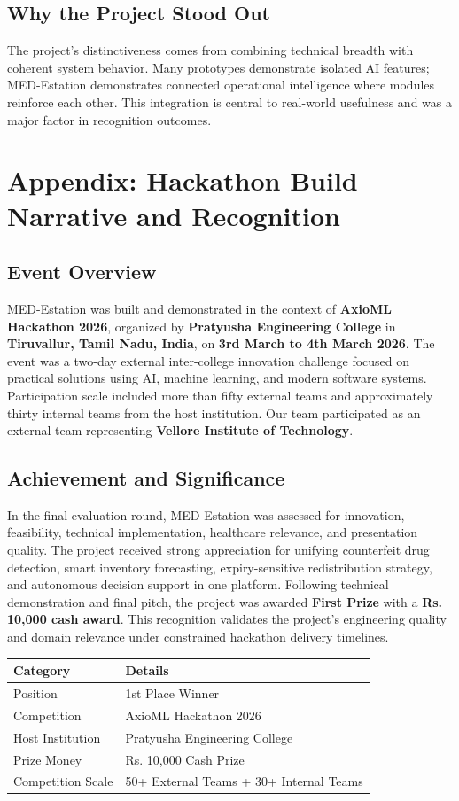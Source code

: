 \documentclass[12pt,a4paper]{article}
\begin{document}
\subsection{Why the Project Stood Out}
The project’s distinctiveness comes from combining technical breadth with coherent system behavior. Many prototypes demonstrate isolated AI features; MED-Estation demonstrates connected operational intelligence where modules reinforce each other. This integration is central to real-world usefulness and was a major factor in recognition outcomes.

\clearpage
\section{Appendix: Hackathon Build Narrative and Recognition}
\subsection{Event Overview}
MED-Estation was built and demonstrated in the context of \textbf{AxioML Hackathon 2026}, organized by \textbf{Pratyusha Engineering College} in \textbf{Tiruvallur, Tamil Nadu, India}, on \textbf{3rd March to 4th March 2026}. The event was a two-day external inter-college innovation challenge focused on practical solutions using AI, machine learning, and modern software systems. Participation scale included more than fifty external teams and approximately thirty internal teams from the host institution. Our team participated as an external team representing \textbf{Vellore Institute of Technology}.

\subsection{Achievement and Significance}
In the final evaluation round, MED-Estation was assessed for innovation, feasibility, technical implementation, healthcare relevance, and presentation quality. The project received strong appreciation for unifying counterfeit drug detection, smart inventory forecasting, expiry-sensitive redistribution strategy, and autonomous decision support in one platform. Following technical demonstration and final pitch, the project was awarded \textbf{First Prize} with a \textbf{Rs. 10,000 cash award}. This recognition validates the project’s engineering quality and domain relevance under constrained hackathon delivery timelines.

\begin{longtable}{>{\raggedright\arraybackslash}p{} p{}}
\toprule
\textbf{Category} & \textbf{Details} \\
\midrule
Position & 1st Place Winner \\
Competition & AxioML Hackathon 2026 \\
Host Institution & Pratyusha Engineering College \\
Prize Money & Rs. 10,000 Cash Prize \\
Competition Scale & 50+ External Teams + 30+ Internal Teams \\
\bottomrule
\end{longtable}
\end{document}
